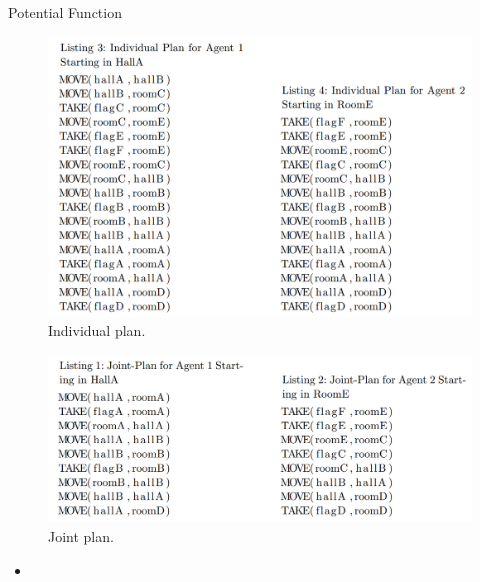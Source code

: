 \documentclass{bredelebeamer}
\begin{document}
\begin{frame}{Potential Function}
\begin{figure}[h!]
\centering
  \includegraphics[height = 0.2\textheight]{../article/img/individualPlan.png}
  \caption{Individual plan.}
  \label{fig:plan1}
\end{figure}

\begin{figure}[h!]
\centering
  \includegraphics[height = 0.2\textheight]{../article/img/joinPlan.png}
  \caption{Joint plan.}
  \label{fig:plan2}
\end{figure}

\begin{block}{}
\begin{itemize}
\item 
\end{itemize}
\end{block}

\end{frame}
\end{document}
